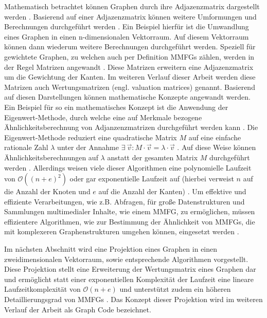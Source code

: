 Mathematisch betrachtet können Graphen durch ihre Adjazenzmatrix dargestellt werden \cite{fast-effec-retr-large-collec}.
Basierend auf einer Adjazenzmatrix können weitere Umformungen und Berechnungen durchgeführt werden \cite{fast-effec-retr-large-collec}. Ein Beispiel hierfür ist die Umwandlung eines Graphen in einen n-dimensionalen Vektorraum. Auf diesem Vektorraum können dann wiederum weitere Berechnungen durchgeführt werden.
Speziell für gewichtete Graphen, zu welchen auch per Definition MMFGs zählen, werden in der Regel Matrizen angewandt \cite{fast-effec-retr-large-collec}.
Diese Matrizen erweitern eine Adjazenzmatrix um die Gewichtung der Kanten.
Im weiteren Verlauf dieser Arbeit werden diese Matrizen auch Wertungsmatrizen (engl. valuation matrices) genannt.
Basierend auf diesen Darstellungen können mathematische Konzepte angewandt werden.
Ein Beispiel für so ein mathematisches Konzept ist die Anwendung der Eigenwert-Methode, durch welche eine auf Merkmale bezogene Ähnlichkeitsberechnung von Adjanzenzmatrizen durchgeführt werden kann \cite{fast-effec-retr-large-collec}.
Die Eigenwert-Methode reduziert eine quadratische Matrix $M$ auf eine einfache rationale Zahl $\lambda$ unter der Annahme $\exists~\Vec{v}: M \cdot \Vec{v} = \lambda \cdot \Vec{v}$ \cite{fast-effec-retr-large-collec}.
Auf diese Weise können Ähnlichkeitsberechnungen auf $\lambda$ anstatt der gesamten Matrix $M$ durchgeführt werden \cite{fast-effec-retr-large-collec}.
Allerdings weisen viele dieser Algorithmen eine polynomielle Laufzeit von $\mathcal{O}((n + e)^2)$ oder gar exponentielle Laufzeit auf (hierbei verweist $n$ auf die Anzahl der Knoten und $e$ auf die Anzahl der Kanten) \cite{fast-effec-retr-large-collec}.
Um effektive und effiziente Verarbeitungen, wie z.B. Abfragen, für große Datenstrukturen und Sammlungen multimedialer Inhalte, wie einem MMFG, zu ermöglichen, müssen effizientere Algorithmen, wie zur Bestimmung der Ähnlichkeit von MMFGs, die mit komplexeren Graphenstrukturen umgehen können, eingesetzt werden \cite{fast-effec-retr-large-collec}.

Im nächsten Abschnitt wird eine Projektion eines Graphen in einen zweidimensionalen Vektorraum, sowie entsprechende Algorithmen vorgestellt.
Diese Projektion stellt eine Erweiterung der Wertungsmatrix eines Graphen dar und ermöglicht statt einer exponentiellen Komplexität der Laufzeit eine lineare Laufzeitkomplexität von $\mathcal{O}(n+e)$ und unterstützt zudem ein höheren Detaillierungsgrad von MMFGs \cite{fast-effec-retr-large-collec}.
Das Konzept dieser Projektion wird im weiteren Verlauf der Arbeit als Graph Code \cite{gc-2d-proj-mmfg} bezeichnet.


